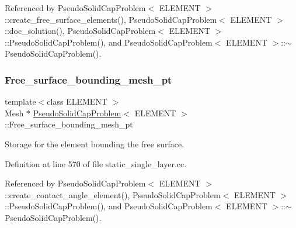 Referenced by Pseudo\+Solid\+Cap\+Problem$<$ E\+L\+E\+M\+E\+N\+T $>$\+::create\+\_\+free\+\_\+surface\+\_\+elements(), Pseudo\+Solid\+Cap\+Problem$<$ E\+L\+E\+M\+E\+N\+T $>$\+::doc\+\_\+solution(), Pseudo\+Solid\+Cap\+Problem$<$ E\+L\+E\+M\+E\+N\+T $>$\+::\+Pseudo\+Solid\+Cap\+Problem(), and Pseudo\+Solid\+Cap\+Problem$<$ E\+L\+E\+M\+E\+N\+T $>$\+::$\sim$\+Pseudo\+Solid\+Cap\+Problem().

\mbox{\label{classPseudoSolidCapProblem_ab0e178700d6f9d2b6a86ae58483d6e2e}} 
\subsubsection{\texorpdfstring{Free\+\_\+surface\+\_\+bounding\+\_\+mesh\+\_\+pt}{Free\_surface\_bounding\_mesh\_pt}}
{\footnotesize\ttfamily template$<$class E\+L\+E\+M\+E\+NT $>$ \\
Mesh $\ast$ \hyperlink{classPseudoSolidCapProblem}{Pseudo\+Solid\+Cap\+Problem}$<$ E\+L\+E\+M\+E\+NT $>$\+::Free\+\_\+surface\+\_\+bounding\+\_\+mesh\+\_\+pt\hspace{0.3cm}{\ttfamily [private]}}



Storage for the element bounding the free surface. 



Definition at line 570 of file static\+\_\+single\+\_\+layer.\+cc.



Referenced by Pseudo\+Solid\+Cap\+Problem$<$ E\+L\+E\+M\+E\+N\+T $>$\+::create\+\_\+contact\+\_\+angle\+\_\+element(), Pseudo\+Solid\+Cap\+Problem$<$ E\+L\+E\+M\+E\+N\+T $>$\+::\+Pseudo\+Solid\+Cap\+Problem(), and Pseudo\+Solid\+Cap\+Problem$<$ E\+L\+E\+M\+E\+N\+T $>$\+::$\sim$\+Pseudo\+Solid\+Cap\+Problem().

\mbox{\label{classPseudoSolidCapProblem_ac1de72bb2e35d6fbd76ef0ea6c19dc48}} 
